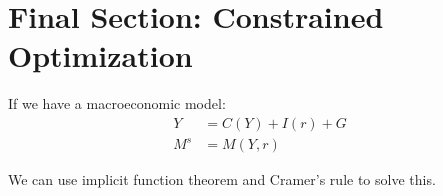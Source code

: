 \section*{Final Section: Constrained Optimization}

If we have a macroeconomic model:
\begin{align*}
    Y &= C(Y) + I(r) + G \\
    M^s &= M(Y,r)
\end{align*}

We can use implicit function theorem and Cramer's rule to solve this.